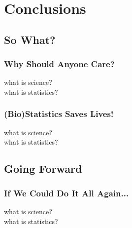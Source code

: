 \documentclass{beamer}
\begin{document}
\section{Conclusions}

\subsection{So What?}

\begin{frame}[fragile]
  	\frametitle{Why Should Anyone Care?}
 		what is science? \\
		what is statistics?
\end{frame}

\begin{frame}[fragile]
  	\frametitle{(Bio)Statistics Saves Lives!}
 		what is science? \\
		what is statistics?
\end{frame}

\subsection{Going Forward}

\begin{frame}[fragile]
  	\frametitle{If We Could Do It All Again...}
		what is science? \\
		what is statistics?
\end{frame}
\end{document}

